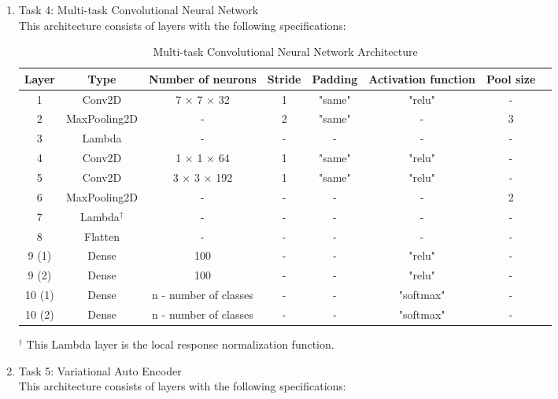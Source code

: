 \documentclass[12pt]{amsart}
\begin{document}
{\begin{enumerate}
	\item{Task 4: Multi-task Convolutional Neural Network} \\

		This architecture consists of layers with the following specifications:

		\begin{table}[h]
		\caption{Multi-task Convolutional Neural Network Architecture}
		\begin{tabular}{c c c c c c c c}
		\hline
		Layer & Type & Number of neurons & Stride & Padding & Activation function & Pool size\\
		\hline
		1 & Conv2D & 7 $\times$ 7 $\times$ 32 & 1 & "same" & "relu" & - \\
		2 & MaxPooling2D & - & 2 & "same" & - & 3\\
		3 & Lambda & - & - & - & - & -\\

		4 & Conv2D & 1 $\times$ 1 $\times$ 64 & 1 & "same" & "relu" & - \\
		5 & Conv2D & 3 $\times$ 3 $\times$ 192 & 1 & "same" & "relu" & - \\
		6 & MaxPooling2D & - & - & - & - & 2\\
		7 & Lambda$^{\dagger}$ & - & - & - & - & -\\
		8 & Flatten & - & - & - & - & -\\
		9 (1) & Dense & 100 & - & - & "relu" & -\\
		9 (2) & Dense & 100 & - & - & "relu" & -\\
		10 (1) & Dense & n - number of classes & - & - & "softmax" & -\\
		10 (2) & Dense & n - number of classes & - & - & "softmax" & -\\
		\hline 
		\end{tabular}
		\end{table}

		$^{\dagger}$ This Lambda layer is the local response normalization function. 

		\vfill
		\pagebreak

	\item{Task 5: Variational Auto Encoder} \\

		This architecture consists of layers with the following specifications: \\


\end{enumerate}}
\end{document}
